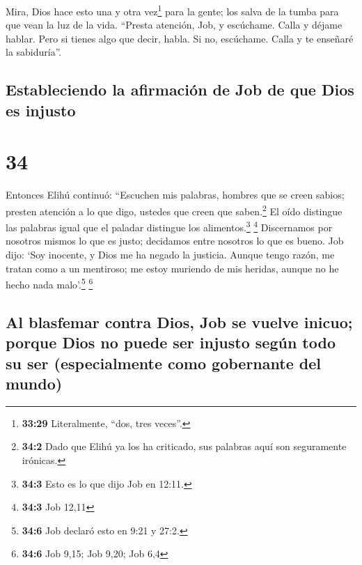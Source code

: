  Mira, Dios hace esto una y otra vez\footnote{\textbf{33:29}
  Literalmente, ``dos, tres veces''.} para la gente;  los
salva de la tumba para que vean la luz de la vida. 
``Presta atención, Job, y escúchame. Calla y déjame hablar.
 Pero si tienes algo que decir, habla.  Si
no, escúchame. Calla y te enseñaré la sabiduría''.

\hypertarget{estableciendo-la-afirmaciuxf3n-de-job-de-que-dios-es-injusto}{%
\subsection{Estableciendo la afirmación de Job de que Dios es
injusto}\label{estableciendo-la-afirmaciuxf3n-de-job-de-que-dios-es-injusto}}

\hypertarget{section-33}{%
\section{34}\label{section-33}}

 Entonces Elihú continuó:  ``Escuchen mis
palabras, hombres que se creen sabios; presten atención a lo que digo,
ustedes que creen que saben.\footnote{\textbf{34:2} Dado que Elihú ya
  los ha criticado, sus palabras aquí son seguramente irónicas.}
 El oído distingue las palabras igual que el paladar
distingue los alimentos.\footnote{\textbf{34:3} Esto es lo que dijo Job
  en 12:11.} \footnote{\textbf{34:3} Job 12,11} 
Discernamos por nosotros mismos lo que es justo; decidamos entre
nosotros lo que es bueno.  Job dijo: `Soy inocente, y Dios
me ha negado la justicia.  Aunque tengo razón, me tratan
como a un mentiroso; me estoy muriendo de mis heridas, aunque no he
hecho nada malo'.\footnote{\textbf{34:6} Job declaró esto en 9:21 y
  27:2.} \footnote{\textbf{34:6} Job 9,15; Job 9,20; Job 6,4}

\hypertarget{al-blasfemar-contra-dios-job-se-vuelve-inicuo-porque-dios-no-puede-ser-injusto-seguxfan-todo-su-ser-especialmente-como-gobernante-del-mundo}{%
\subsection{Al blasfemar contra Dios, Job se vuelve inicuo; porque Dios
no puede ser injusto según todo su ser (especialmente como gobernante
del
mundo)}\label{al-blasfemar-contra-dios-job-se-vuelve-inicuo-porque-dios-no-puede-ser-injusto-seguxfan-todo-su-ser-especialmente-como-gobernante-del-mundo}}

